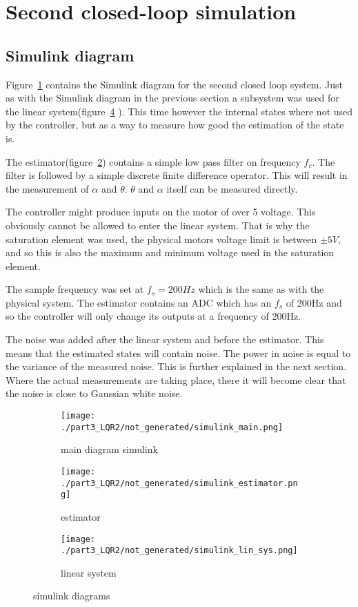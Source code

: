 \section{Second closed-loop simulation}

\subsection{Simulink diagram}
	Figure~\ref{fig: simulink diagram main} contains the Simulink diagram for the second closed loop system. Just as with the Simulink diagram in the previous section a subsystem was used for the linear system(figure~\ref{fig: simulink diagram lin system LQR2} ). This time however the internal states where not used by the controller, but as a way to measure how good the estimation of the state is. 
	
	The estimator(figure~\ref{fig: simulink estimator}) contains a simple low pass filter on frequency $f_c$. The filter is followed by a simple discrete finite difference operator. This will result in the measurement of $\dot{\alpha}$ and $\dot{\theta}$. $\theta$ and $\alpha$ itself can be measured directly.
	
	The controller might produce inputs on the motor of over 5 voltage. This obviously cannot be allowed to enter the linear system. That is why the saturation element was used, the physical motors voltage limit is between $\pm 5V$, and so this is also the maximum and minimum voltage used in the saturation element.
	
	The sample frequency was set at $f_s=200Hz$ which is the same as with the physical system. The estimator contains an ADC which has an $f_s$ of 200Hz and so the controller will only change its outputs at a frequency of 200Hz.
	
	The noise was added after the linear system and before the estimator. This means that the estimated states will contain noise. The power in noise is equal to the variance of the measured noise. This is further explained in the next section. Where the actual measurements are taking place, there it will become clear that the noise is close to Gaussian white noise.

	\begin{figure}[H]
		\centering
		\begin{subfigure}[b]{0.7\textwidth}
			\texttt{[image: ./part3\_LQR2/not\_generated/simulink\_main.png]}
			\caption{main diagram simulink}
			\label{fig: simulink diagram main}
		\end{subfigure}
		\begin{subfigure}[b]{0.45\textwidth}
			\texttt{[image: ./part3\_LQR2/not\_generated/simulink\_estimator.png]}
			\caption{estimator}
			\label{fig: simulink estimator}
		\end{subfigure}
		\begin{subfigure}[b]{0.45\textwidth}
			\texttt{[image: ./part3\_LQR2/not\_generated/simulink\_lin\_sys.png]}
			\caption{linear system}
			\label{fig: simulink diagram lin system LQR2}
		\end{subfigure}
		\caption{simulink diagrams}
	\end{figure}

